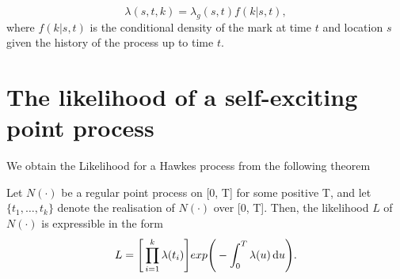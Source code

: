 \begin{equation*}
    \lambda(s, t, k) = \lambda_g(s, t)f(k | s, t),
\end{equation*}
where $f(k | s, t)$ is the conditional density of the mark at time $t$ and location $s$ given the history of the process up to time $t$.

\section{The likelihood of a self-exciting point process}

We obtain the Likelihood for a Hawkes process from the following theorem {\color{missing a little introduction parhaps?}}

\begin{theorem}
    Let $N(\cdot)$ be a regular point process on [0, T] for some positive T, and let $\{ t_1, \dots, t_k \}$ denote the realisation of $N(\cdot)$ over [0, T]. Then, the likelihood $L$ of $N(\cdot)$ is expressible in the form
    \begin{equation*}
        L = \Bigg [ \prod_{i=1}^k \lambda(t_i) \Bigg] exp \Bigg( - \int_0^T \lambda(u) \operatorname{d}\!{u} \Bigg).
    \end{equation*}
\end{theorem}


